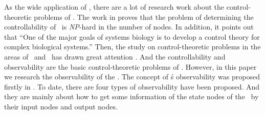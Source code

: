


      

As the wide application of \BCNs, there are a lot of research work about the control-theoretic problems of \BCNs. The work in \cite{Akutsu2007Control} proves that the problem of determining the controllability of \BCNs\ is {\em NP}-hard in the number of nodes. In addition, it points out that ``One of the major goals of systems biology is to develop a control theory for complex biological systems.'' Then, the study on control-theoretic problems in the areas of \BNs\ and \BCNs\ has drawn great attention \cite{cheng2009controllability, Zhao2010Input, Cheng2011Identification, Cheng2011Analysis,Fornasini2013Observability}. And the controllability and observability are the basic control-theoretic problems of \BCNs. %
However, in this paper we research the observability of the \BCNs. The concept of \BCN\'s observability was proposed firstly in \cite{cheng2009controllability}. To date, there are four types of observability have been proposed. And they are mainly about how to get some information of the state nodes of the \BCNs\ by their input nodes and output nodes.

